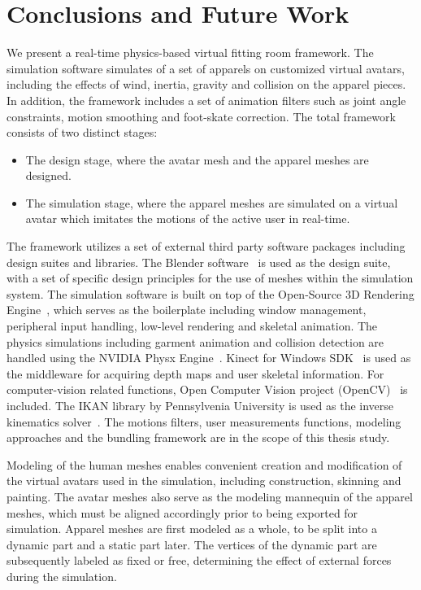 \chapter{Conclusions and Future Work}
\label{chapter_conclusion}

We present a real-time physics-based virtual fitting room framework. The simulation software simulates of a set of apparels on customized virtual avatars, including the effects of wind, inertia, gravity and collision on the apparel pieces. In addition, the framework includes a set of animation filters such as joint angle constraints, motion smoothing and foot-skate correction. The total framework consists of two distinct stages:

\begin{itemize}
  \item The design stage, where the avatar mesh and the apparel meshes are designed. 
  \item The simulation stage, where the apparel meshes are simulated on a virtual avatar which imitates the motions of the active user in real-time.   
\end{itemize}

The framework utilizes a set of external third party software packages including design suites and libraries. The Blender software~\cite{Blender} is used as the design suite, with a set of specific design principles for the use of meshes within the simulation system. The simulation software is built on top of the Open-Source 3D Rendering Engine~\cite{Knot2012}, which serves as the boilerplate including window management, peripheral input handling, low-level rendering and skeletal animation. The physics simulations including garment animation and collision detection are handled using the NVIDIA Physx Engine~\cite{WikiPhysx2012}. Kinect for Windows SDK~\cite{Microsoft2013} is used as the middleware for acquiring depth maps and user skeletal information. For computer-vision related functions, Open Computer Vision project (OpenCV)~\cite{opencv_library} is included. The IKAN library by Pennsylvenia University is used as the inverse kinematics solver~\cite{IKAN2013}. The motions filters, user measurements functions, modeling approaches and the bundling framework are in the scope of this thesis study. 

Modeling of the human meshes enables convenient creation and modification of the virtual avatars used in the simulation, including construction, skinning and painting. The avatar meshes also serve as the modeling mannequin of the apparel meshes, which must be aligned accordingly prior to being exported for simulation. Apparel meshes are first modeled as a whole, to be split into a dynamic part and a static part later. The vertices of the dynamic part are subsequently labeled as fixed or free, determining the effect of external forces during the simulation.

